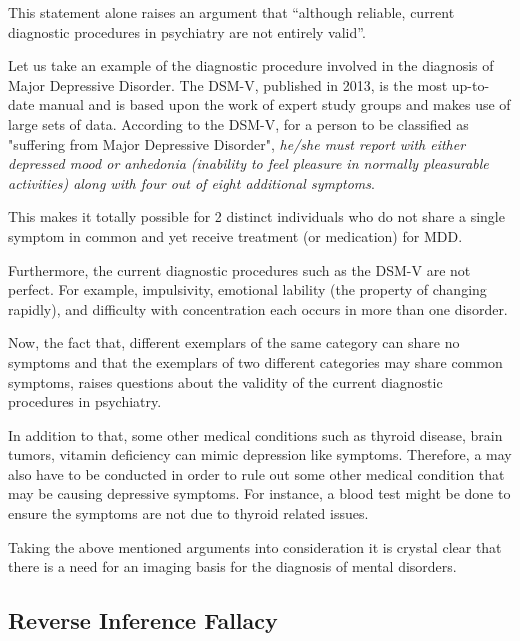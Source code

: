 \documentclass{article}
\begin{document}
This statement alone raises an argument that ``although reliable,
current diagnostic procedures in psychiatry are not entirely valid''.

\iffalse
Reliable in the sense that any trained professional will arrive at
the same diagnosis for each patient.

Valid in the sense that it reflects the underlying psychological
and biological commonalities and differences among different
disorders to a certain extent. Validity continues to be more
difficult to achieve.
\fi

Let us take an example of the diagnostic procedure involved in the
diagnosis of Major Depressive Disorder. The DSM-V, published in 2013,
is the most up-to-date manual and is based upon the work of expert
study groups and makes use of large sets of data. According to the
DSM-V, for a person to be classified as "suffering from Major
Depressive Disorder", \textit{he/she must report with either depressed
mood or anhedonia (inability to feel pleasure in normally pleasurable
activities) along with four out of eight additional symptoms}.

This makes it totally possible for 2 distinct individuals who do not
share a single symptom in common and yet receive treatment (or
medication) for MDD.

Furthermore, the current diagnostic procedures such as the DSM-V are
not perfect. For example, impulsivity, emotional lability (the
property of changing rapidly), and difficulty with concentration each
occurs in more than one disorder.

Now, the fact that, different exemplars of the same category can share
no symptoms and that the exemplars of two different categories may
share common symptoms, raises questions about the validity of the
current diagnostic procedures in psychiatry.

In addition to that, some other medical conditions such as thyroid
disease, brain tumors, vitamin deficiency can mimic depression like
symptoms. Therefore, a may also have to be conducted in order to rule
out some other medical condition that may be causing depressive
symptoms. For instance, a blood test might be done to ensure the
symptoms are not due to thyroid related issues.

Taking the above mentioned arguments into consideration it is crystal
clear that there is a need for an imaging basis for the diagnosis of
mental disorders.

\newpage
\subsection{Reverse Inference Fallacy}
\end{document}

